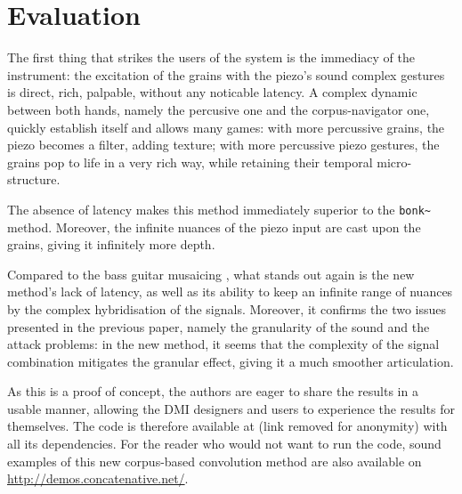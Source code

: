 \section{Evaluation}\label{sec:eval}

The first thing that strikes the users of the system is the immediacy of the instrument: the excitation of the grains with the piezo's sound complex gestures is direct, rich, palpable, without any noticable latency. A complex dynamic between both hands, namely the percusive one and the corpus-navigator one, quickly establish itself and allows many games: with more percussive grains, the piezo becomes a filter, adding texture; with more percussive piezo gestures, the grains pop to life in a very rich way, while retaining their temporal micro-structure.


The absence of latency makes this method immediately superior to the \verb|bonk~| method. Moreover, the infinite nuances of the piezo input are cast upon the grains, giving it infinitely more depth.

Compared to the bass guitar musaicing \cite{TremblaySchwarz-nime2010-surfing-the-waves}, what stands out again is the new method's lack of latency, as well as its ability to keep an infinite range of nuances by the complex hybridisation of the signals. Moreover, it confirms the two issues presented in the previous paper, namely the granularity of the sound and the attack problems: in the new method, it seems that the complexity of the signal combination mitigates the granular effect, giving it a much smoother articulation.

As this is a proof of concept, the authors are eager to share the results in a usable manner, allowing the DMI designers and users to experience the results for themselves. The code is therefore available at (link removed for anonymity) with all its dependencies. For the reader who would not want to run the code, sound examples of this new corpus-based convolution method are also available on \url{http://demos.concatenative.net/}.
